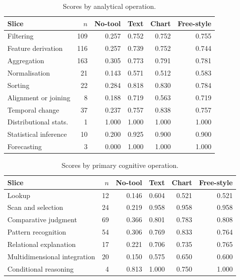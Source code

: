 \documentclass{article}
\begin{document}
\begin{table}[h]
\caption{Scores by analytical operation.}
\label{tab:operation-slices}
\centering
\small
\setlength{\tabcolsep}{4pt}
\begin{tabular}{@{}lrrrrr@{}}
\toprule
Slice & $n$ & No-tool & Text & Chart & Free-style \\
\midrule
Filtering             & 109 & 0.257 & 0.752 & 0.752 & 0.755 \\
Feature derivation    & 116 & 0.257 & 0.739 & 0.752 & 0.744 \\
Aggregation           & 163 & 0.305 & 0.773 & 0.791 & 0.781 \\
Normalisation         &  21 & 0.143 & 0.571 & 0.512 & 0.583 \\
Sorting               &  22 & 0.284 & 0.818 & 0.830 & 0.784 \\
Alignment or joining  &   8 & 0.188 & 0.719 & 0.563 & 0.719 \\
Temporal change       &  37 & 0.237 & 0.757 & 0.838 & 0.757 \\
Distributional stats. &   1 & 1.000 & 1.000 & 1.000 & 1.000 \\
Statistical inference &  10 & 0.200 & 0.925 & 0.900 & 0.900 \\
Forecasting           &   3 & 0.000 & 1.000 & 1.000 & 1.000 \\
\bottomrule
\end{tabular}
\end{table}

\begin{table}[h]
\caption{Scores by primary cognitive operation.}
\label{tab:cognitive-slices}
\centering
\small
\setlength{\tabcolsep}{4pt}
\begin{tabular}{@{}lrrrrr@{}}
\toprule
Slice & $n$ & No-tool & Text & Chart & Free-style \\
\midrule
Lookup                       & 12 & 0.146 & 0.604 & 0.521 & 0.521 \\
Scan and selection           & 24 & 0.219 & 0.958 & 0.958 & 0.958 \\
Comparative judgment         & 69 & 0.366 & 0.801 & 0.783 & 0.808 \\
Pattern recognition          & 54 & 0.306 & 0.769 & 0.833 & 0.764 \\
Relational explanation       & 17 & 0.221 & 0.706 & 0.735 & 0.765 \\
Multidimensional integration & 20 & 0.150 & 0.575 & 0.650 & 0.600 \\
Conditional reasoning        &  4 & 0.813 & 1.000 & 0.750 & 1.000 \\
\bottomrule
\end{tabular}
\end{table}
\end{document}
